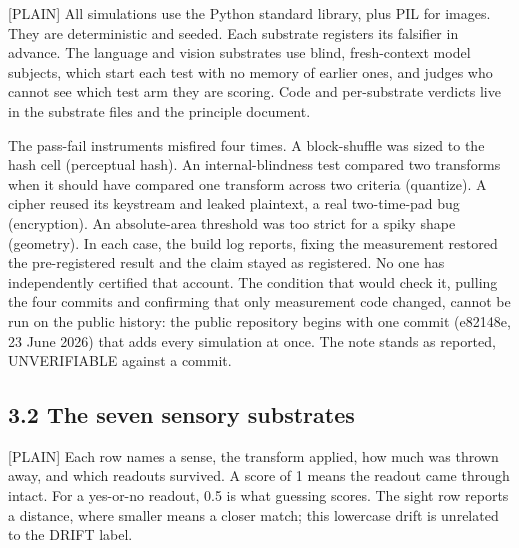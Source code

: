 \documentclass[11pt]{article}
\newcommand{\register}[1]{{\ttfamily\small #1}}
\begin{document}
\register{[PLAIN]} All simulations use the Python standard library, plus PIL for images. They are deterministic and seeded. Each substrate registers its falsifier in advance. The language and vision substrates use blind, fresh-context model subjects, which start each test with no memory of earlier ones, and judges who cannot see which test arm they are scoring. Code and per-substrate verdicts live in the substrate files and the principle document.

The pass-fail instruments misfired four times. A block-shuffle was sized to the hash cell (perceptual hash). An internal-blindness test compared two transforms when it should have compared one transform across two criteria (quantize). A cipher reused its keystream and leaked plaintext, a real two-time-pad bug (encryption). An absolute-area threshold was too strict for a spiky shape (geometry). In each case, the build log reports, fixing the measurement restored the pre-registered result and the claim stayed as registered. No one has independently certified that account. The condition that would check it, pulling the four commits and confirming that only measurement code changed, cannot be run on the public history: the public repository begins with one commit (e82148e, 23 June 2026) that adds every simulation at once. The note stands as reported, UNVERIFIABLE against a commit.

\subsection*{3.2 The seven sensory substrates}

\register{[PLAIN]} Each row names a sense, the transform applied, how much was thrown away, and which readouts survived. A score of 1 means the readout came through intact. For a yes-or-no readout, 0.5 is what guessing scores. The sight row reports a distance, where smaller means a closer match; this lowercase drift is unrelated to the DRIFT label.
\end{document}
